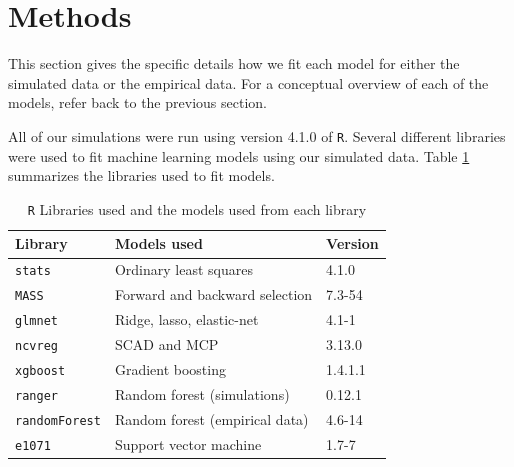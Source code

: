 \documentclass{article}
\begin{document}
\section{Methods}

This section gives the specific details how we fit each model for either the simulated data or the empirical data. For a conceptual overview of each of the models, refer back to the previous section.

All of our simulations were run using version 4.1.0 of \lstinline!R!. Several different libraries were used to fit machine learning models using our simulated data. Table \ref{tab:model-libraries} summarizes the libraries used to fit models.

\begin{table}[h]
	\centering
	\caption{\lstinline!R! Libraries used and the models used from each library}
	\label{tab:model-libraries}
	\begin{tabular}{lll}\hline
		\textbf{Library}    	  & \textbf{Models used}                                 & \textbf{Version} \\ \hline
		\lstinline!stats! \cite{r}   	  & Ordinary least squares                               & 4.1.0            \\
		\lstinline!MASS! \cite{venables2002mass}   	  & Forward and backward selection                       & 7.3-54           \\
		\lstinline!glmnet! \cite{friedman2010regularization} 	  & Ridge, lasso, elastic-net                            & 4.1-1            \\
		\lstinline!ncvreg! \cite{breheny2011ncvreg}	      & SCAD and MCP                                         & 3.13.0           \\
		\lstinline!xgboost! \cite{chen2021xgboost}	  & Gradient boosting                                    & 1.4.1.1          \\
		\lstinline!ranger! \cite{wright2017ranger} 	  & Random forest (simulations)                          & 0.12.1           \\
		\lstinline!randomForest! \cite{liaw2002rf} & Random forest (empirical data)                       & 4.6-14           \\
		\lstinline!e1071! \cite{meyer2021e1071}  	  & Support vector machine                               & 1.7-7            \\\hline
	\end{tabular}
\end{table}
\end{document}
